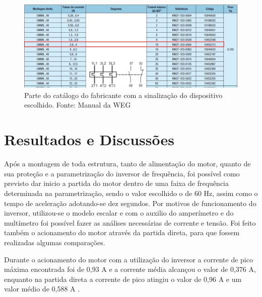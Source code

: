 \documentclass[a4paper, 12pt,oneside, english, brazil]{abntex2}
\begin{document}
\begin{figure}[H]
    \centering
    \includegraphics[scale=0.5]{rele.png}
    \caption{Parte do catálogo do fabricante com a sinalização do dispositivo escolhido. Fonte: Manual da WEG}
    \label{rele}
\end{figure}

\chapter{Resultados e Discussões}


Após a montagem de toda estrutura, tanto de alimentação do motor, quanto de sua proteção e a parametrização do inversor de frequência, foi possível como previsto dar inicio a partida do motor dentro de uma faixa de frequência determinada na parametrização, sendo o valor escolhido o de 60 Hz, assim como o tempo de aceleração adotando-se dez segundos. Por motivos de funcionamento do inversor, utilizou-se o modelo escalar e com o auxilio do amperímetro e do multímetro foi possível fazer as análises necessárias de corrente e tensão. Foi feito também o acionamento do motor através da partida direta, para que fossem realizadas algumas comparações.

Durante o acionamento do motor com a utilização do inversor a corrente de pico máxima encontrada foi de 0,93 A e a corrente média alcançou o valor de 0,376 A, enquanto na partida direta a corrente de pico atingiu o valor de 0,96 A e um valor médio de 0,588 A .
\end{document}
